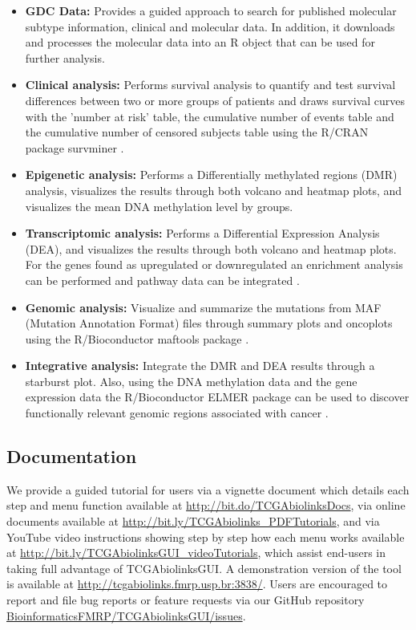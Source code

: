 \begin{itemize}
	\item \textbf{GDC Data:} Provides a guided approach to search for published molecular subtype information, clinical and molecular data. In addition, it downloads and processes the molecular data into an R object that can be used for further analysis.
	\item \textbf{Clinical analysis:} Performs survival analysis to quantify and test survival differences between two or more groups of patients and draws survival curves with the 'number at risk' table, the cumulative number of events table and the cumulative number of censored subjects table using the R/CRAN package survminer \cite{survminer}.
	\item \textbf{Epigenetic analysis:} Performs a Differentially methylated regions (DMR) analysis, visualizes the results through both volcano and heatmap plots, and visualizes the mean DNA methylation level by groups.
	\item \textbf{Transcriptomic analysis:} Performs a Differential Expression Analysis (DEA), and visualizes the results through both volcano and heatmap plots. For the genes found as upregulated or downregulated an enrichment analysis can be performed and pathway data can be integrated \cite{luo2013pathview}.
 	\item \textbf{Genomic analysis:} Visualize and summarize the mutations from MAF (Mutation Annotation Format) files through summary plots and oncoplots using the R/Bioconductor maftools package \cite{Gu20052016,Maftools}. %
	\item \textbf{Integrative analysis:} Integrate the DMR and DEA results through a starburst plot. Also, using the DNA methylation data and the gene expression data the R/Bioconductor ELMER package can be used to discover functionally relevant genomic regions associated with cancer \cite{yao2015inferring, ELMER2}.
\end{itemize}

\subsection{Documentation}

We provide a guided tutorial for users via a vignette document which details each step and menu function available at \href{http://bit.do/TCGAbiolinksDocs}{http://bit.do/TCGAbiolinksDocs}, via online documents available at 
\href{http://bit.ly/TCGAbiolinks\_PDFTutorials}{http://bit.ly/TCGAbiolinks\_PDFTutorials}, and via YouTube video instructions showing step by step how each menu works available at \href{http://bit.ly/TCGAbiolinksGUI\_videoTutorials}{http://bit.ly/TCGAbiolinksGUI\_videoTutorials}, which assist end-users in taking full advantage of TCGAbiolinksGUI. A demonstration version of the tool is available at \href{http://tcgabiolinks.fmrp.usp.br:3838/}{http://tcgabiolinks.fmrp.usp.br:3838/}. Users are encouraged to report and file bug reports or feature requests via our GitHub repository \href{https://github.com/BioinformaticsFMRP/TCGAbiolinksGUI/issues}{BioinformaticsFMRP/TCGAbiolinksGUI/issues}. 

